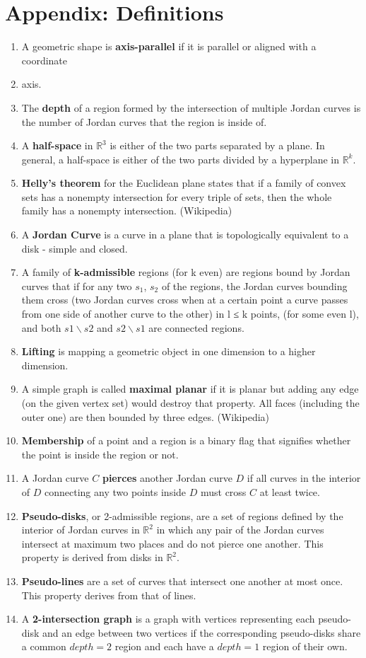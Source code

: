 \documentclass{NSF}
\begin{document}
\section{Appendix: Definitions}
\begin{enumerate}
\item A geometric shape is \textbf{axis-parallel} if it is parallel or aligned with a coordinate 
\item axis.
\item The \textbf{depth} of a region formed by the intersection of multiple Jordan curves is the number of Jordan curves that the region is inside of.
\item A \textbf{half-space} in $\mathbb{R}^3$ is either of the two parts separated by a plane. In general, a half-space is either of the two parts divided by a hyperplane in $\mathbb{R}^k$.
\item \textbf{Helly's theorem} for the Euclidean plane states that if a family of convex sets has a nonempty intersection for every triple of sets, then the whole family has a nonempty intersection. (Wikipedia)
\item A \textbf{Jordan Curve} is a curve in a plane that is topologically equivalent to a disk - simple and closed.
\item A family of \textbf{k-admissible} regions (for k even) are regions bound by Jordan curves that if for any two $s_1$, $s_2$ of the regions, the Jordan curves bounding them cross (two Jordan curves cross when at a certain point a curve passes from one side of another curve to the other) in l ≤ k points, (for some even l), and both $s1\backslash s2$ and $s2\backslash s1$ are connected regions. \cite{Pyrga:2008:NEP:1377676.1377708}
\item \textbf{Lifting} is mapping a geometric object in one dimension to a higher dimension.
\item A simple graph is called \textbf{maximal planar} if it is planar but adding any edge (on the given vertex set) would destroy that property. All faces (including the outer one) are then bounded by three edges. (Wikipedia)
\item \textbf{Membership} of a point and a region is a binary flag that signifies whether the point is inside the region or not.
\item A Jordan curve $C$ \textbf{pierces} another Jordan curve $D$ if all curves in the interior of $D$ connecting any two points inside $D$ must cross $C$ at least twice.
\item \textbf{Pseudo-disks}, or 2-admissible regions, are a set of regions defined by the interior of Jordan curves in $\mathbb{R}^2$ in which any pair of the Jordan curves intersect at maximum two places and do not pierce one another. This property is derived from disks in $\mathbb{R}^2$.
\item \textbf{Pseudo-lines} are a set of curves that intersect one another at most once. This property derives from that of lines.
\item A \textbf{2-intersection graph} is a graph with vertices representing each pseudo-disk and an edge between two vertices if the corresponding pseudo-disks share a common $depth=2$ region and each have a $depth=1$ region of their own.


\end{enumerate}
\end{document}
